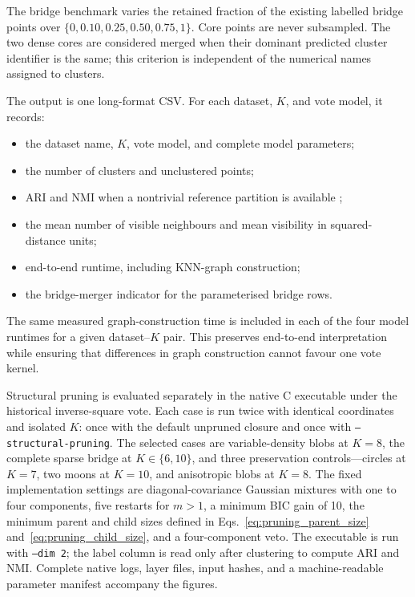 \documentclass[pdflatex,sn-mathphys-num]{sn-jnl}
\begin{document}
The bridge benchmark varies the retained fraction of the existing labelled bridge points over $\{0,0.10,0.25,0.50,0.75,1\}$. Core points are never subsampled. The two dense cores are considered merged when their dominant predicted cluster identifier is the same; this criterion is independent of the numerical names assigned to clusters.

The output is one long-format CSV\@. For each dataset, $K$, and vote model, it records:
\begin{itemize}
    \item the dataset name, $K$, vote model, and complete model parameters;
    \item the number of clusters and unclustered points;
    \item ARI and NMI when a nontrivial reference partition is available \citep{HubertArabie1985,VinhEppsBailey2010};
    \item the mean number of visible neighbours and mean visibility in squared-distance units;
    \item end-to-end runtime, including KNN-graph construction;
    \item the bridge-merger indicator for the parameterised bridge rows.
\end{itemize}
The same measured graph-construction time is included in each of the four model runtimes for a given dataset--$K$ pair. This preserves end-to-end interpretation while ensuring that differences in graph construction cannot favour one vote kernel.

Structural pruning is evaluated separately in the native C executable under
the historical inverse-square vote.  Each case is run twice with identical
coordinates and isolated $K$: once with the default unpruned closure and once
with \texttt{--structural-pruning}.  The selected cases are variable-density
blobs at $K=8$, the complete sparse bridge at $K\in\{6,10\}$, and three
preservation controls---circles at $K=7$, two moons at $K=10$, and anisotropic
blobs at $K=8$.  The fixed implementation settings are diagonal-covariance
Gaussian mixtures with one to four components, five restarts for $m>1$, a
minimum BIC gain of 10, the minimum parent and child sizes defined in
Eqs.~\eqref{eq:pruning_parent_size} and~\eqref{eq:pruning_child_size}, and a
four-component veto.  The executable is
run with \texttt{--dim 2}; the label column is read only after clustering to compute
ARI and NMI\@.  Complete native logs, layer files, input hashes, and a
machine-readable parameter manifest accompany the figures.
\end{document}
